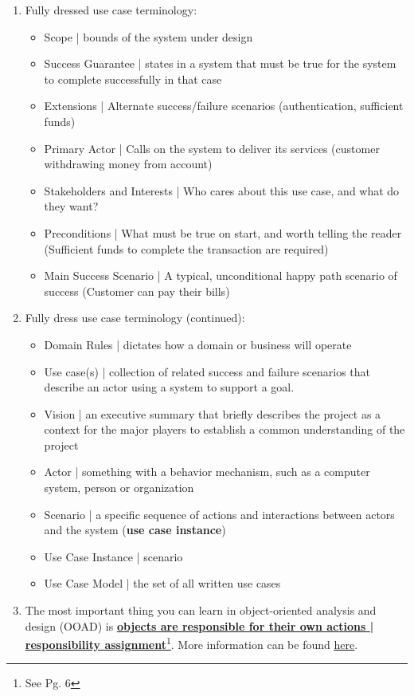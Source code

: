\documentclass{article}
\begin{document}
\begin{enumerate}
\item Fully dressed use case terminology:
\begin{itemize}
\item Scope | bounds of the system under design
\item Success Guarantee | states in a system that must be true for the system to complete successfully in that case
\item Extensions | Alternate success/failure scenarios (authentication, sufficient funds)
\item Primary Actor | Calls on the system to deliver its services (customer withdrawing money from account)
\item Stakeholders and Interests | Who cares about this use case, and what do they want? 
\item Preconditions | What must be true on start, and worth telling the reader (Sufficient funds to complete the transaction are required)
\item Main Success Scenario | A typical, unconditional happy path scenario of success (Customer can pay their bills)
\end{itemize}

\newpage

\item Fully dress use case terminology (continued):
\begin{itemize}
\item Domain Rules | dictates how a domain or business will operate
\item Use case(s) | collection of related success and failure scenarios that describe an actor using a system to support a goal.
\item Vision | an executive summary that briefly describes the project as a context for the major players to establish a common understanding of the project
\item Actor | something with a behavior mechanism, such as a computer system, person or organization
\item Scenario | a specific sequence of actions and interactions between actors and the system (\textbf{use case instance})
\item Use Case Instance | scenario
\item Use Case Model | the set of all written use cases
\end{itemize}

\item The most important thing you can learn in object-oriented analysis and design (OOAD) is \underline{\textbf{objects are responsible for their own actions | responsibility assignment}}\footnote{See Pg. 6}. More information can be found \href{https://www.umsl.edu/~sauterv/analysis/488_f01_papers/quillin.htm}{\underline{here}}. 


\end{enumerate}
\end{document}
